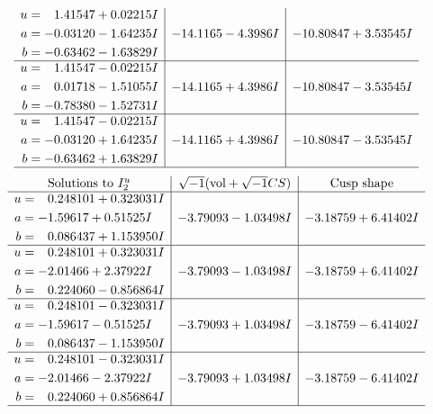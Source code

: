\documentclass[1p]{elsarticle_modified}
\theoremstyle{definition}
\newcommand{\I}{\sqrt{-1}}
\begin{document}
$$\begin{array}{c|c|c}
\begin{aligned}
u &= \phantom{-}1.41547 + 0.02215 I \\
a &= -0.03120 - 1.64235 I \\
b &= -0.63462 - 1.63829 I\end{aligned}
 & -14.1165 - 4.3986 I & -10.80847 + 3.53545 I \\ \hline\begin{aligned}
u &= \phantom{-}1.41547 - 0.02215 I \\
a &= \phantom{-}0.01718 - 1.51055 I \\
b &= -0.78380 - 1.52731 I\end{aligned}
 & -14.1165 + 4.3986 I & -10.80847 - 3.53545 I \\ \hline\begin{aligned}
u &= \phantom{-}1.41547 - 0.02215 I \\
a &= -0.03120 + 1.64235 I \\
b &= -0.63462 + 1.63829 I\end{aligned}
 & -14.1165 + 4.3986 I & -10.80847 - 3.53545 I\\
 \hline 
 \end{array}$$\newpage$$\begin{array}{c|c|c}  
\text{Solutions to }I^u_{2}& \I (\text{vol} + \sqrt{-1}CS) & \text{Cusp shape}\\
 \hline 
\begin{aligned}
u &= \phantom{-}0.248101 + 0.323031 I \\
a &= -1.59617 + 0.51525 I \\
b &= \phantom{-}0.086437 + 1.153950 I\end{aligned}
 & -3.79093 - 1.03498 I & -3.18759 + 6.41402 I \\ \hline\begin{aligned}
u &= \phantom{-}0.248101 + 0.323031 I \\
a &= -2.01466 + 2.37922 I \\
b &= \phantom{-}0.224060 - 0.856864 I\end{aligned}
 & -3.79093 - 1.03498 I & -3.18759 + 6.41402 I \\ \hline\begin{aligned}
u &= \phantom{-}0.248101 - 0.323031 I \\
a &= -1.59617 - 0.51525 I \\
b &= \phantom{-}0.086437 - 1.153950 I\end{aligned}
 & -3.79093 + 1.03498 I & -3.18759 - 6.41402 I \\ \hline\begin{aligned}
u &= \phantom{-}0.248101 - 0.323031 I \\
a &= -2.01466 - 2.37922 I \\
b &= \phantom{-}0.224060 + 0.856864 I\end{aligned}
 & -3.79093 + 1.03498 I & -3.18759 - 6.41402 I\\
 \hline 
 \end{array}$$\newpage\newpage\renewcommand{\arraystretch}{1}
\end{document}
